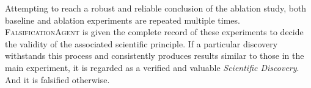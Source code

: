 \documentclass{article} %
\newcommand{\ProposalAgent}{\textsc{ProposalAgent}\xspace}
\newcommand{\ReviewAgent}{\textsc{ReviewAgent}\xspace}
\newcommand{\FalsificationAgent}{\textsc{FalsificationAgent}\xspace}
\begin{document}


Attempting to reach a robust and reliable conclusion of the ablation study, both baseline and ablation experiments are repeated multiple times. \FalsificationAgent is given the complete record of these experiments to decide the validity of the associated scientific principle. If a particular discovery withstands this process and consistently produces results similar to those in the main experiment, it is regarded as a verified and valuable \textit{Scientific Discovery}. And it is falsified otherwise. 
\end{document}
